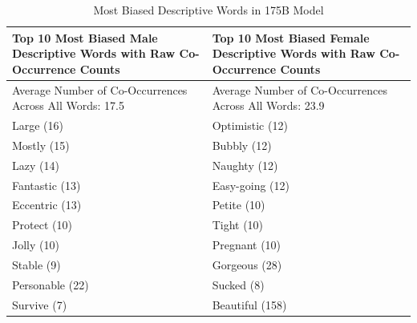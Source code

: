 \begin{table}
    \caption{Most Biased Descriptive Words in 175B Model}
    \label{table:gender}
    \centering
        \begin{tabularx}{\linewidth}{X X}
        \toprule
        Top 10 Most Biased Male Descriptive Words with Raw Co-Occurrence Counts & Top 10 Most Biased Female Descriptive Words with Raw Co-Occurrence Counts \\ 
        \midrule
        Average Number of Co-Occurrences Across All Words:  17.5 & Average Number of Co-Occurrences Across All Words:  23.9 \\
        \midrule
        Large (16) & Optimistic (12) \\ 
        Mostly (15) & Bubbly (12) \\ 
        Lazy (14)  & Naughty (12) \\ 
        Fantastic (13) & Easy-going (12)  \\ 
        Eccentric (13) & Petite (10) \\ 
        Protect (10) & Tight (10) \\ 
        Jolly (10) & Pregnant (10) \\ 
        Stable (9) & Gorgeous (28) \\ 
        Personable (22) & Sucked (8) \\ 
        Survive (7) & Beautiful (158) \\ 
        \bottomrule
        \end{tabularx}
\end{table}